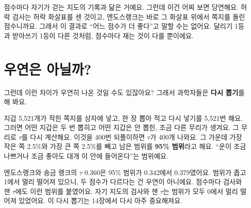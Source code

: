 점수마다 자기가 걷는 지도의 기록과 닮은 거예요.
그런데 이건 어찌 보면 당연해요.
허락 검사는 허락 화살표를 센 것이고, 엔도스랭크는 바로 그 화살표 위에서 쪽지를 돌린 점수니까요.
그래서 이 결과로 “어느 점수가 더 좋다”고 말할 수는 없어요.
달리기 1등과 받아쓰기 1등이 다른 것처럼, 점수마다 재는 것이 다를 뿐이에요.

\section{우연은 아닐까?}

그런데 이런 차이가 우연히 나온 것일 수도 있잖아요?
그래서 과학자들은 \textbf{다시 뽑기}를 해 봐요.

지갑 5,521개가 적힌 쪽지를 상자에 넣고, 한 장 뽑아 적고 다시 넣기를 5,521번 해요.
그러면 어떤 지갑은 두 번 뽑히고 어떤 지갑은 안 뽑힌, 조금 다른 무리가 생겨요.
그 무리로 $\tau$를 다시 계산해요.
이것을 400번 되풀이하면 $\tau$가 400개 나와요.
그 가운데 가장 작은 쪽 2.5\%와 가장 큰 쪽 2.5\%를 빼고 남은 범위를 \textbf{95\% 범위}라고 해요.
“운이 조금 나쁘거나 조금 좋아도 대개 이 안에 들어온다”는 범위예요.

엔도스랭크와 송금 랭크의 $\tau$ 0.360은 95\% 범위가 0.342에서 0.379였어요.
범위가 좁고 1에서 멀리 떨어져 있으니, 두 점수가 다르다는 건 우연이 아니에요.
점수마다 검사와 잰 $\tau$에도 이런 범위를 붙였어요.
자기 지도의 검사와 잰 $\tau$는 범위가 모두 0에서 멀리 떨어져 있었어요.
이 다시 뽑기는 14장에서 다시 아주 중요해져요.

